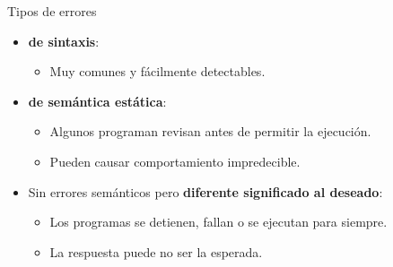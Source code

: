 \documentclass[mathserif]{beamer}
\begin{document}
\begin{frame}{Tipos de errores}
    \begin{itemize}
        \item {\bfseries\orange de sintaxis}: 
            \begin{itemize}
                \item {\blue Muy} comunes y fácilmente detectables.
            \end{itemize}
        
        \item {\bfseries\orange de semántica estática}:
            \begin{itemize}
                \item Algunos programan revisan antes de permitir la ejecución.
                \item Pueden causar comportamiento impredecible.
            \end{itemize}
            
        \item Sin errores semánticos pero {\bfseries\orange diferente significado al deseado}: 
            \begin{itemize}
                \item Los programas se detienen, fallan o se ejecutan para siempre.
                \item La respuesta puede no ser la esperada.
            \end{itemize}
    \end{itemize}
    
\end{frame}

\end{document}
